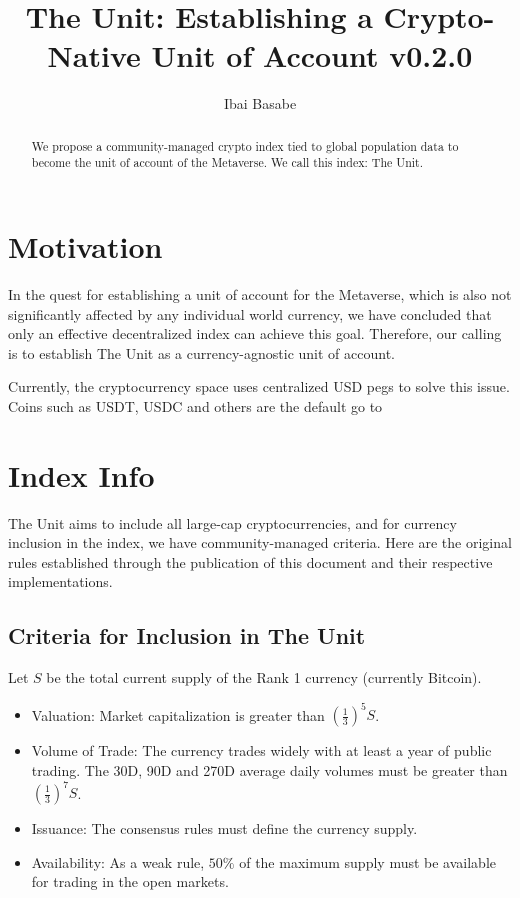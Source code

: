 \documentclass[12pt]{article}
\title{The Unit: Establishing a Crypto-Native Unit of Account v0.2.0}
\author{Ibai Basabe}
\begin{document}
\pagecolor{yellow!15!}

\date{}

\maketitle


\begin{abstract}
We propose a community-managed crypto index tied to global population data to become the unit of account of the Metaverse. We call this index: The Unit. 
\end{abstract}


\tableofcontents
\newpage

\section{Motivation}

In the quest for establishing a unit of account for the Metaverse, which is also not significantly affected by any individual world currency, we have concluded that only an effective decentralized index can achieve this goal. Therefore, our calling is to establish The Unit as a currency-agnostic unit of account. 

Currently, the cryptocurrency space uses centralized USD pegs to solve this issue. Coins such as USDT, USDC and others are the default go to  

\section{Index Info}

The Unit aims to include all large-cap cryptocurrencies, and for currency inclusion in the index, we have community-managed criteria. Here are the original rules established through the publication of this document and their respective implementations.

\subsection{Criteria for Inclusion in The Unit}

Let $S$ be the total current supply of the Rank 1 currency (currently Bitcoin).

\begin{itemize}

\item Valuation: Market capitalization is greater than $\left(\frac{1}{3}\right)^5 S$.
\item Volume of Trade: The currency trades widely with at least a year of public trading. The 30D, 90D and 270D average daily volumes must be greater than $\left(\frac{1}{3}\right)^7 S$.
\item Issuance: The consensus rules must define the currency supply.
\item Availability: As a weak rule, $50\%$ of the maximum supply must be available for trading in the open markets.

\end{itemize}
\end{document}
